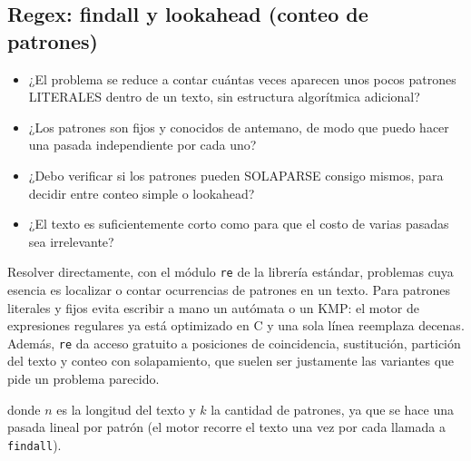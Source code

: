\subsection{Regex: findall y lookahead (conteo de patrones)}
\label{alg:9-6}


\begin{itemize}
\item ¿El problema se reduce a contar cuántas veces aparecen unos pocos patrones LITERALES dentro de un texto, sin estructura algorítmica adicional?
\item ¿Los patrones son fijos y conocidos de antemano, de modo que puedo hacer una pasada independiente por cada uno?
\item ¿Debo verificar si los patrones pueden SOLAPARSE consigo mismos, para decidir entre conteo simple o lookahead?
\item ¿El texto es suficientemente corto como para que el costo de varias pasadas sea irrelevante?
\end{itemize}

 Resolver directamente, con el módulo \texttt{re} de la librería estándar, problemas cuya esencia es localizar o contar ocurrencias de patrones en un texto. Para patrones literales y fijos evita escribir a mano un autómata o un KMP: el motor de expresiones regulares ya está optimizado en C y una sola línea reemplaza decenas. Además, \texttt{re} da acceso gratuito a posiciones de coincidencia, sustitución, partición del texto y conteo con solapamiento, que suelen ser justamente las variantes que pide un problema parecido.

  donde $n$ es la longitud del texto y $k$ la cantidad de patrones, ya que se hace una pasada lineal por patrón (el motor recorre el texto una vez por cada llamada a \texttt{findall}).


